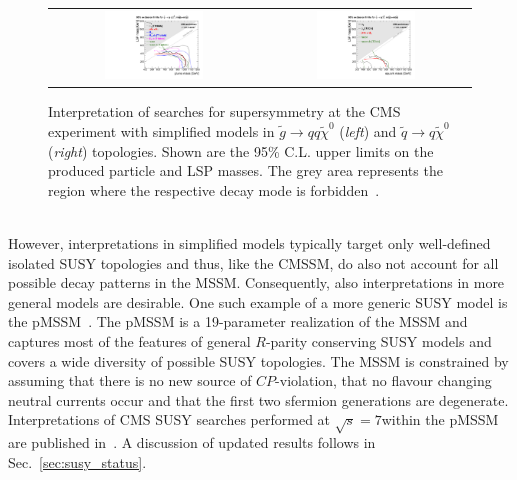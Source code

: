 \begin{figure}[!t]
  \centering 
  \begin{tabular}{cc}
    \includegraphics[width=0.49\textwidth]{figures/T1_7TeV.pdf} &
    \includegraphics[width=0.49\textwidth]{figures/T2_7TeV.pdf}
  \end{tabular}
  \caption{Interpretation of searches for supersymmetry at the CMS experiment with simplified models in $\tilde{g} \rightarrow qq\tilde{\chi}^0$ (\textit{left}) and $\tilde{q} \rightarrow q \tilde{\chi}^0$ (\textit{right}) topologies. Shown are the 95\% C.L. upper limits on the produced particle and LSP masses. The grey area represents the region where the respective decay mode is forbidden~\cite{Chatrchyan:2013sza}.}
  \label{fig:SMS_7TeV}
\end{figure}
 \\
However, interpretations in simplified models typically target only well-defined isolated SUSY topologies and thus, like the CMSSM, do also not account for all possible decay patterns in the MSSM. Consequently, also interpretations in more general models are desirable. One such example of a more generic SUSY model is the pMSSM~\cite{Djouadi:1998di}. The pMSSM is a 19-parameter realization of the MSSM and captures most of the features of general $R$-parity conserving SUSY models and covers a wide diversity of possible SUSY topologies. The MSSM is constrained by assuming that there is no new source of $CP$-violation, that no flavour changing neutral currents occur and that the first two sfermion generations are degenerate. Interpretations of CMS SUSY searches performed at $\sqrt{s} = 7$\tev within the pMSSM are published in~\cite{CMS-PAS-SUS-12-030}. A discussion of updated results follows in Sec.~\ref{sec:susy_status}.
